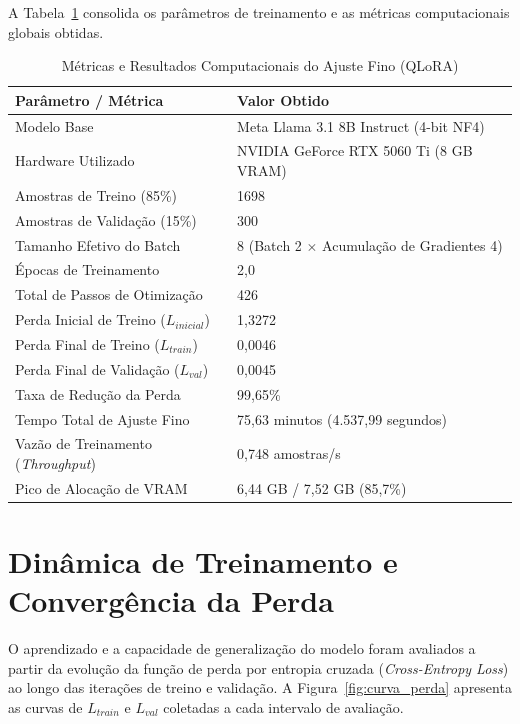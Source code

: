 A Tabela~\ref{tab:metricas_treinamento} consolida os parâmetros de treinamento e as métricas computacionais globais obtidas.

\begin{table}[htbp]
\centering
\caption{Métricas e Resultados Computacionais do Ajuste Fino (QLoRA)}
\label{tab:metricas_treinamento}
\begin{tabular}{ll}
\hline
\textbf{Parâmetro / Métrica} & \textbf{Valor Obtido} \\ \hline
Modelo Base & Meta Llama 3.1 8B Instruct (4-bit NF4) \\
Hardware Utilizado & NVIDIA GeForce RTX 5060 Ti (8 GB VRAM) \\
Amostras de Treino (85\%) & 1698 \\
Amostras de Validação (15\%) & 300 \\
Tamanho Efetivo do Batch & 8 (Batch 2 $\times$ Acumulação de Gradientes 4) \\
Épocas de Treinamento & 2,0 \\
Total de Passos de Otimização & 426 \\
Perda Inicial de Treino ($L_{inicial}$) & 1,3272 \\
Perda Final de Treino ($L_{train}$) & 0,0046 \\
Perda Final de Validação ($L_{val}$) & 0,0045 \\
Taxa de Redução da Perda & 99,65\% \\
Tempo Total de Ajuste Fino & 75,63 minutos (4.537,99 segundos) \\
Vazão de Treinamento (\textit{Throughput}) & 0,748 amostras/s \\
Pico de Alocação de VRAM & 6,44 GB / 7,52 GB (85,7\%) \\ \hline
\end{tabular}
\end{table}

\section{Dinâmica de Treinamento e Convergência da Perda}

O aprendizado e a capacidade de generalização do modelo foram avaliados a partir da evolução da função de perda por entropia cruzada (\textit{Cross-Entropy Loss}) ao longo das iterações de treino e validação. A Figura~\ref{fig:curva_perda} apresenta as curvas de $L_{train}$ e $L_{val}$ coletadas a cada intervalo de avaliação.

